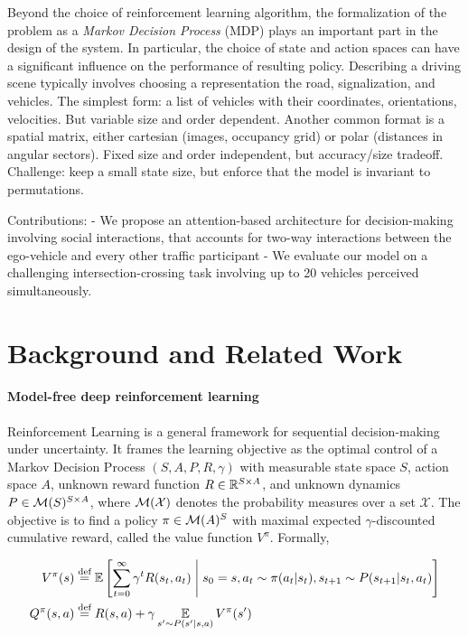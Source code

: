 \documentclass{article}
\begin{document}
Beyond the choice of reinforcement learning algorithm, the formalization of the problem as a \emph{Markov Decision Process} (MDP) plays an important part in the design of the system. In particular, the choice of state and action spaces can have a significant influence on the performance of resulting policy. Describing a driving scene typically involves choosing a representation the road, signalization, and vehicles. The simplest form: a list of vehicles with their coordinates, orientations, velocities. But variable size and order dependent. Another common format is a spatial matrix, either cartesian (images, occupancy grid) or polar (distances in angular sectors). Fixed size and order independent, but accuracy/size tradeoff. Challenge: keep a small state size, but enforce that the model is invariant to permutations.

Contributions:
- We propose an attention-based architecture for decision-making involving social interactions, that accounts for two-way interactions between the ego-vehicle and every other traffic participant
- We evaluate our model on a challenging intersection-crossing task involving up to 20 vehicles perceived simultaneously.

\section{Background and Related Work}

\paragraph{Model-free deep reinforcement learning} Reinforcement Learning is a general framework for sequential decision-making under uncertainty. It frames the learning objective as the optimal control of a Markov Decision Process $(S, A, P, R, \gamma)$ with measurable state space $S$, action space $A$, unknown reward function $R\in\mathbb{R}^{S \times A}$, and unknown dynamics $P\in \mathcal{M}(S)^{S \times A}$, where $\mathcal{M}(\mathcal{X})$ denotes the probability measures over a set $\mathcal{X}$. The objective is to find a policy $\pi\in\mathcal{M}(A)^S$ with maximal expected $\gamma$-discounted cumulative reward, called the value function $V^\pi$. Formally,

\begin{align*}
V^\pi(s) &\eqdef \expectedvalue\left[\sum_{t=0}^\infty \gamma^t R(s_t, a_t)\condbar s_0=s, a_t\sim \pi(a_t|s_t), s_{t+1}\sim P(s_{t+1}|s_t, a_t)\right]\\
Q^\pi(s, a) &\eqdef R(s, a) + \gamma \expectedvalueover{s'\sim P(s'|s, a)} V^\pi(s')
\end{align*}
\end{document}
